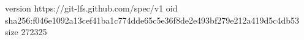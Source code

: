 version https://git-lfs.github.com/spec/v1
oid sha256:f046e1092a13cef41ba1c774dde65c5e36f8de2e493bf279e212a419d5c4db53
size 272325
